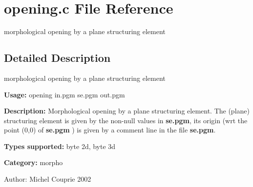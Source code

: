\section{opening.c File Reference}
\label{opening_8c}
morphological opening by a plane structuring element  




\label{_details}
\subsection{Detailed Description}
morphological opening by a plane structuring element 

{\bf Usage:} opening in.pgm se.pgm out.pgm

{\bf Description:} Morphological opening by a plane structuring element. The (plane) structuring element is given by the non-null values in {\bf se.pgm}, its origin (wrt the point (0,0) of {\bf se.pgm} ) is given by a comment line in the file {\bf se.pgm}.

{\bf Types supported:} byte 2d, byte 3d

{\bf Category:} morpho

\begin{Desc}
\item[Author:]Michel Couprie 2002 \end{Desc}
